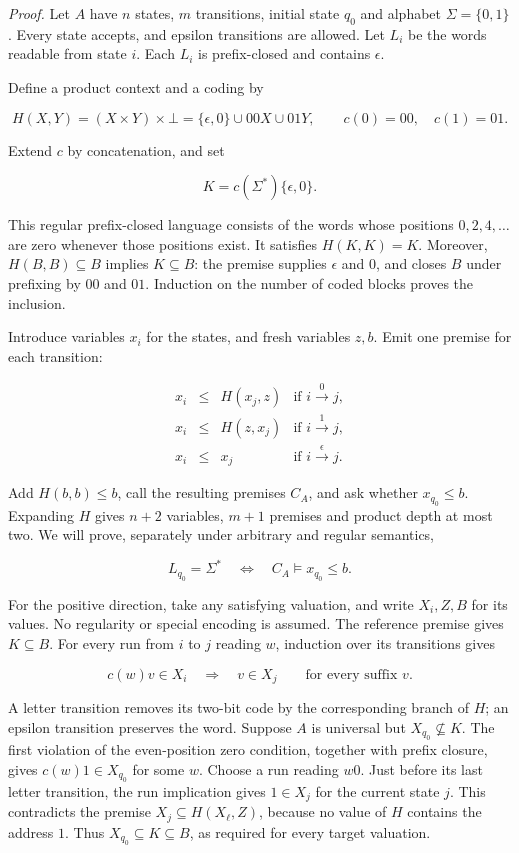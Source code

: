 \documentclass[
  11pt,
  a4paper,
]{article}
\begin{document}
\emph{Proof.} Let \(A\) have \(n\) states, \(m\) transitions, initial
state \(q_0\) and alphabet \(\Sigma=\{0,1\}\). Every state accepts, and
epsilon transitions are allowed. Let \(L_i\) be the words readable from
state \(i\). Each \(L_i\) is prefix-closed and contains \(\epsilon\).

Define a product context and a coding by

\[H(X,Y)=(X\times Y)\times\bot
=\{\epsilon,0\}\cup00X\cup01Y,
\qquad c(0)=00,\quad c(1)=01.\]

Extend \(c\) by concatenation, and set

\[K=c(\Sigma^*)\{\epsilon,0\}.\]

This regular prefix-closed language consists of the words whose
positions \(0,2,4,\ldots\) are zero whenever those positions exist. It
satisfies \(H(K,K)=K\). Moreover, \(H(B,B)\subseteq B\) implies
\(K\subseteq B\): the premise supplies \(\epsilon\) and \(0\), and
closes \(B\) under prefixing by \(00\) and \(01\). Induction on the
number of coded blocks proves the inclusion.

Introduce variables \(x_i\) for the states, and fresh variables \(z,b\).
Emit one premise for each transition:

\[\begin{array}{rcll}
x_i&\le&H(x_j,z)&\text{if }i\xrightarrow{0}j,\\
x_i&\le&H(z,x_j)&\text{if }i\xrightarrow{1}j,\\
x_i&\le&x_j&\text{if }i\xrightarrow{\epsilon}j.
\end{array}\]

Add \(H(b,b)\le b\), call the resulting premises \(C_A\), and ask
whether \(x_{q_0}\le b\). Expanding \(H\) gives \(n+2\) variables,
\(m+1\) premises and product depth at most two. We will prove,
separately under arbitrary and regular semantics,

\[L_{q_0}=\Sigma^*\quad\Longleftrightarrow\quad
C_A\models x_{q_0}\le b.\]

For the positive direction, take any satisfying valuation, and write
\(X_i,Z,B\) for its values. No regularity or special encoding is
assumed. The reference premise gives \(K\subseteq B\). For every run
from \(i\) to \(j\) reading \(w\), induction over its transitions gives

\[c(w)v\in X_i\quad\Longrightarrow\quad v\in X_j
\qquad\text{for every suffix }v.\]

A letter transition removes its two-bit code by the corresponding branch
of \(H\); an epsilon transition preserves the word. Suppose \(A\) is
universal but \(X_{q_0}\nsubseteq K\). The first violation of the
even-position zero condition, together with prefix closure, gives
\(c(w)1\in X_{q_0}\) for some \(w\). Choose a run reading \(w0\). Just
before its last letter transition, the run implication gives
\(1\in X_j\) for the current state \(j\). This contradicts the premise
\(X_j\subseteq H(X_\ell,Z)\), because no value of \(H\) contains the
address \(1\). Thus \(X_{q_0}\subseteq K\subseteq B\), as required for
every target valuation.
\end{document}
